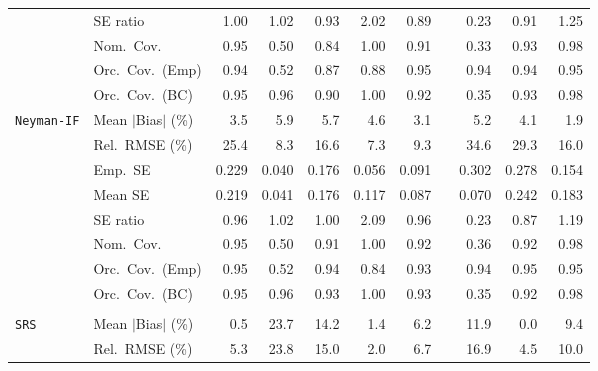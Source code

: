 \begin{landscape}
\begin{longtable}{llrrrrrrrrr}
 & SE ratio & \cellcolor{rankone}1.00 & \cellcolor{ranktwo}1.02 & \cellcolor{rankthree}0.93 & 2.02 & 0.89 &  & 0.23 & 0.91 & 1.25 \\
 & Nom.\ Cov. & \cellcolor{rankone}0.95 & 0.50 & 0.84 & 1.00 & 0.91 &  & 0.33 & \cellcolor{ranktwo}0.93 & \cellcolor{rankthree}0.98 \\
 & Orc.\ Cov.\ (Emp) & \cellcolor{ranktwo}0.94 & 0.52 & 0.87 & \cellcolor{rankthree}0.88 & \cellcolor{rankone}0.95 &  & \cellcolor{ranktwo}0.94 & \cellcolor{ranktwo}0.94 & \cellcolor{rankone}0.95 \\
 & Orc.\ Cov.\ (BC) & \cellcolor{rankone}0.95 & \cellcolor{ranktwo}0.96 & 0.90 & 1.00 & 0.92 &  & 0.35 & \cellcolor{rankthree}0.93 & 0.98 \\
\addlinespace[2pt]
\quad \texttt{Neyman-IF} & Mean $|$Bias$|$ (\%) & \cellcolor{rankthree}3.5 & 5.9 & 5.7 & 4.6 & \cellcolor{ranktwo}3.1 &  & 5.2 & 4.1 & \cellcolor{rankone}1.9 \\
 & Rel.\ RMSE (\%) & 25.4 & \cellcolor{ranktwo}8.3 & 16.6 & \cellcolor{rankone}7.3 & \cellcolor{rankthree}9.3 &  & 34.6 & 29.3 & 16.0 \\
 & Emp.\ SE & 0.229 & 0.040 & 0.176 & 0.056 & 0.091 &  & 0.302 & 0.278 & 0.154 \\
 & Mean SE & 0.219 & 0.041 & 0.176 & 0.117 & 0.087 &  & 0.070 & 0.242 & 0.183 \\
 & SE ratio & \cellcolor{rankthree}0.96 & \cellcolor{ranktwo}1.02 & \cellcolor{rankone}1.00 & 2.09 & \cellcolor{rankthree}0.96 &  & 0.23 & 0.87 & 1.19 \\
 & Nom.\ Cov. & \cellcolor{rankone}0.95 & 0.50 & \cellcolor{rankthree}0.91 & 1.00 & \cellcolor{ranktwo}0.92 &  & 0.36 & \cellcolor{ranktwo}0.92 & \cellcolor{ranktwo}0.98 \\
 & Orc.\ Cov.\ (Emp) & \cellcolor{rankone}0.95 & 0.52 & \cellcolor{ranktwo}0.94 & 0.84 & \cellcolor{rankthree}0.93 &  & \cellcolor{ranktwo}0.94 & \cellcolor{rankone}0.95 & \cellcolor{rankone}0.95 \\
 & Orc.\ Cov.\ (BC) & \cellcolor{rankone}0.95 & \cellcolor{ranktwo}0.96 & \cellcolor{rankthree}0.93 & 1.00 & \cellcolor{rankthree}0.93 &  & 0.35 & 0.92 & 0.98 \\
\addlinespace[2pt]
\multicolumn{11}{l}{\textbf{Continuous Phase-One Covariates}} \\
\addlinespace[2pt]
\quad \texttt{SRS} & Mean $|$Bias$|$ (\%) & \cellcolor{ranktwo}0.5 & 23.7 & 14.2 & \cellcolor{rankthree}1.4 & 6.2 &  & 11.9 & \cellcolor{rankone}0.0 & 9.4 \\
 & Rel.\ RMSE (\%) & \cellcolor{rankthree}5.3 & 23.8 & 15.0 & \cellcolor{rankone}2.0 & 6.7 &  & 16.9 & \cellcolor{ranktwo}4.5 & 10.0 \\

\end{longtable}
\end{landscape}
